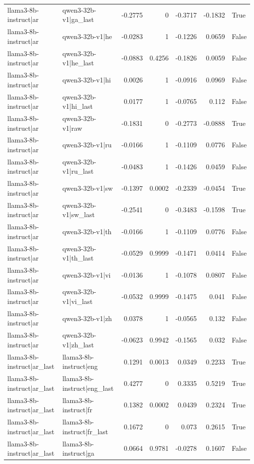 \begin{table}
\begin{tabular}{l l r r r r l}
llama3-8b-instruct|ar & qwen3-32b-v1|ga_last & -0.2775 & 0 & -0.3717 & -0.1832 & True \\
llama3-8b-instruct|ar & qwen3-32b-v1|he & -0.0283 & 1 & -0.1226 & 0.0659 & False \\
llama3-8b-instruct|ar & qwen3-32b-v1|he_last & -0.0883 & 0.4256 & -0.1826 & 0.0059 & False \\
llama3-8b-instruct|ar & qwen3-32b-v1|hi & 0.0026 & 1 & -0.0916 & 0.0969 & False \\
llama3-8b-instruct|ar & qwen3-32b-v1|hi_last & 0.0177 & 1 & -0.0765 & 0.112 & False \\
llama3-8b-instruct|ar & qwen3-32b-v1|raw & -0.1831 & 0 & -0.2773 & -0.0888 & True \\
llama3-8b-instruct|ar & qwen3-32b-v1|ru & -0.0166 & 1 & -0.1109 & 0.0776 & False \\
llama3-8b-instruct|ar & qwen3-32b-v1|ru_last & -0.0483 & 1 & -0.1426 & 0.0459 & False \\
llama3-8b-instruct|ar & qwen3-32b-v1|sw & -0.1397 & 0.0002 & -0.2339 & -0.0454 & True \\
llama3-8b-instruct|ar & qwen3-32b-v1|sw_last & -0.2541 & 0 & -0.3483 & -0.1598 & True \\
llama3-8b-instruct|ar & qwen3-32b-v1|th & -0.0166 & 1 & -0.1109 & 0.0776 & False \\
llama3-8b-instruct|ar & qwen3-32b-v1|th_last & -0.0529 & 0.9999 & -0.1471 & 0.0414 & False \\
llama3-8b-instruct|ar & qwen3-32b-v1|vi & -0.0136 & 1 & -0.1078 & 0.0807 & False \\
llama3-8b-instruct|ar & qwen3-32b-v1|vi_last & -0.0532 & 0.9999 & -0.1475 & 0.041 & False \\
llama3-8b-instruct|ar & qwen3-32b-v1|zh & 0.0378 & 1 & -0.0565 & 0.132 & False \\
llama3-8b-instruct|ar & qwen3-32b-v1|zh_last & -0.0623 & 0.9942 & -0.1565 & 0.032 & False \\
llama3-8b-instruct|ar_last & llama3-8b-instruct|eng & 0.1291 & 0.0013 & 0.0349 & 0.2233 & True \\
llama3-8b-instruct|ar_last & llama3-8b-instruct|eng_last & 0.4277 & 0 & 0.3335 & 0.5219 & True \\
llama3-8b-instruct|ar_last & llama3-8b-instruct|fr & 0.1382 & 0.0002 & 0.0439 & 0.2324 & True \\
llama3-8b-instruct|ar_last & llama3-8b-instruct|fr_last & 0.1672 & 0 & 0.073 & 0.2615 & True \\
llama3-8b-instruct|ar_last & llama3-8b-instruct|ga & 0.0664 & 0.9781 & -0.0278 & 0.1607 & False \\

\end{tabular}
\end{table}
